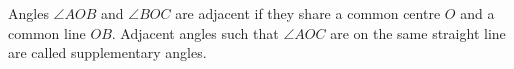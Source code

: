 
Angles $\angle AOB$ and $\angle BOC$ are adjacent if they share a common centre $O$ and a common line $OB$. Adjacent angles such that $\angle AOC$ are on the same straight line are called supplementary angles.
  